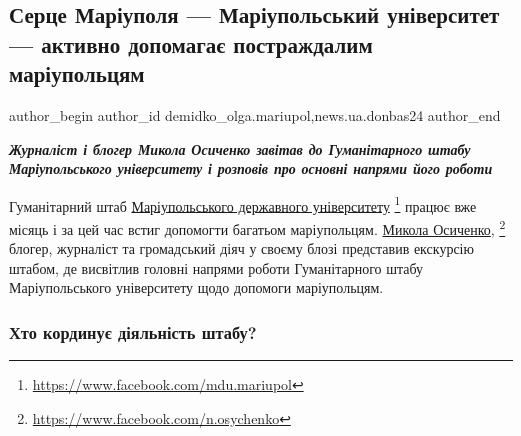  
 
 
 
 
 
\subsection{Серце Маріуполя — Маріупольський університет — активно допомагає постраждалим маріупольцям}
\label{sec:02_08_2022.stz.news.ua.donbas24.1.serce_mrpl_mdu_dopomagaje_mrplci}
 
\ifcmt
 author_begin
   author_id demidko_olga.mariupol,news.ua.donbas24
 author_end
\fi

\begin{center}
  \em\color{blue}\bfseries\Large
Журналіст і блогер Микола Осиченко завітав до Гуманітарного штабу
Маріупольського університету і розповів про основні напрями його роботи
\end{center}

Гуманітарний штаб \href{https://www.facebook.com/mdu.mariupol}{Маріупольського державного університету}%
\footnote{\url{https://www.facebook.com/mdu.mariupol}} працює вже місяць і за
цей час встиг допомогти багатьом маріупольцям. \href{https://www.facebook.com/n.osychenko}{Микола Осиченко},%
\footnote{\url{https://www.facebook.com/n.osychenko}} блогер, журналіст та
громадський діяч у своєму блозі представив екскурсію штабом, де висвітлив
головні напрями роботи Гуманітарного штабу Маріупольського університету щодо
допомоги маріупольцям.


\subsubsection{Хто кординує діяльність штабу?}

